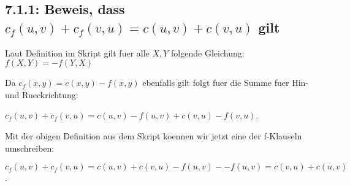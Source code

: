 \subsection*{7.1.1: Beweis, dass $c_f(u,v)+c_f(v,u)=c(u,v)+c(v,u)$ gilt}

Laut Definition im Skript gilt fuer alle $X,Y$  folgende Gleichung: $f(X,Y) = - f(Y,X)$

Da $c_f(x,y) = c(x,y) - f(x,y)$ ebenfalls gilt folgt fuer die Summe fuer Hin- und Rueckrichtung:

$c_f(u,v)+c_f(v,u) = c(u,v) - f(u,v) + c(v,u) - f(v,u)$.

Mit der obigen Definition aus dem Skript koennen wir jetzt eine der f-Klauseln umschreiben:

$c_f(u,v)+c_f(v,u) = c(u,v) + c(v,u) - f(u,v) - -f(u,v) = c(v,u) + c(u,v)$.

